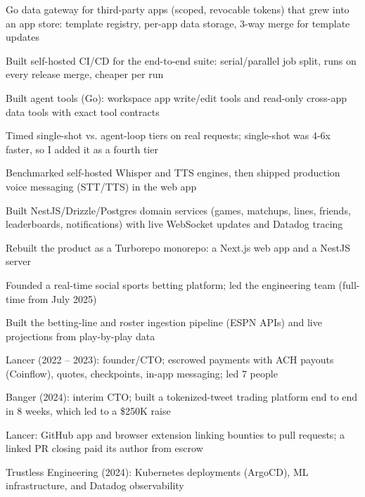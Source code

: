 \documentclass[print]{jack-resume}
\begin{document}
\begin{tightemize}
    \item Go data gateway for third-party apps (scoped, revocable tokens) that grew into an app store: template registry, per-app data storage, 3-way merge for template updates
    \item Built self-hosted CI/CD for the end-to-end suite: serial/parallel job split, runs on every release merge, cheaper per run
    \item Built agent tools (Go): workspace app write/edit tools and read-only cross-app data tools with exact tool contracts
    \item Timed single-shot vs. agent-loop tiers on real requests; single-shot was 4-6x faster, so I added it as a fourth tier
    \item Benchmarked self-hosted Whisper and TTS engines, then shipped production voice messaging (STT/TTS) in the web app
\end{tightemize}
\sectionsep

\begin{tightemize}
    \item Built NestJS/Drizzle/Postgres domain services (games, matchups, lines, friends, leaderboards, notifications) with live WebSocket updates and Datadog tracing
    \item Rebuilt the product as a Turborepo monorepo: a Next.js web app and a NestJS server
    \item Founded a real-time social sports betting platform; led the engineering team (full-time from July 2025)
    \item Built the betting-line and roster ingestion pipeline (ESPN APIs) and live projections from play-by-play data
\end{tightemize}
\sectionsep

\begin{tightemize}
    \item Lancer (2022 -- 2023): founder/CTO; escrowed payments with ACH payouts (Coinflow), quotes, checkpoints, in-app messaging; led 7 people
    \item Banger (2024): interim CTO; built a tokenized-tweet trading platform end to end in 8 weeks, which led to a \$250K raise
    \item Lancer: GitHub app and browser extension linking bounties to pull requests; a linked PR closing paid its author from escrow
    \item Trustless Engineering (2024): Kubernetes deployments (ArgoCD), ML infrastructure, and Datadog observability
\end{tightemize}
\sectionsep
\end{document}
